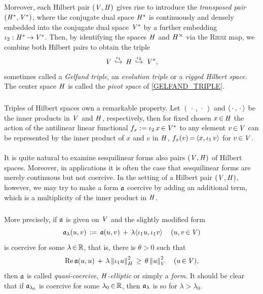 \documentclass[11pt,twoside]{article}
\begin{document}
\subparagraph*{} %
Moreover,
each Hilbert pair $(\mathit{V},\mathit{H})$ gives rise to introduce
the \textit{transposed pair} $(\mathit{H}^*,\mathit{V}^*)$,
where the conjugate dual space $\mathit{H}^*$
is continuously and densely embedded into
the conjugate dual space $\mathit{V}^*$
by a further embedding $\iota_2:\mathit{H}^* {\,\to\,} \mathit{V}^*$.
Then,
by identifying the spaces $\mathit{H}$ and $\mathit{H}^{\times}$
via the \textsc{Riesz} map,
we combine both Hilbert pairs to obtain the triple
\begin{equation}\label{GELFAND_TRIPLE}
\mathit{V} \, \overset{\iota_1}{\hookrightarrow} \,
\mathit{H} \, \overset{\iota_2}{\hookrightarrow} \, \mathit{V}^*,
\end{equation}
sometimes called a \textit{Gelfand triple},
an \textit{evolution triple} or a \textit{rigged Hilbert space}.
The center space $\mathit{H}$ is called
the \textit{pivot space} of \eqref{GELFAND_TRIPLE}.

\subparagraph*{}
Triples of Hilbert spaces own a remarkable property.
Let $(\,\cdot\,,\,\cdot\,)$ and $\langle \,\cdot\,,\,\cdot\, \rangle$
be the inner products in $\mathit{V}$ and $\mathit{H}$, respectively,
then for fixed chosen $x {\,\in\,} \mathit{H}$
the action of the antilinear linear functional
$f_x := \iota_2 \, x {\,\in\,} \mathit{V}^*$ to any element $v {\,\in\,} \mathit{V}$
can be represented by the inner product of $x$ and $v$ in $\mathit{H}$,
{\ie} $f_x(v) {\,=\,} \langle x,\iota_1 \, v \rangle$ for $v {\,\in\,} \mathit{V}$.

\paragraph*{} %
It is quite natural to examine sesquilinear forms
also {\wrt} pairs $(\mathit{V},\mathit{H})$ of Hilbert spaces.
Moreover,
in applications it is often the case
that sesquilinear forms are merely continuous but not coercive.
In the setting of a Hilbert pair $(\mathit{V},\mathit{H})$,
however,
we may try to make a form $\mathfrak{a}$ coercive
by adding an additional term,
which is a multiplicity of the inner product in $\mathit{H}$.

\subparagraph*{}
More precisely,
if $\mathfrak{a}$ is given on $\mathit{V}$ and the slightly modified form
\[
\mathfrak{a}_{\lambda}(u,v) \,:=\,
\mathfrak{a}(u,v) \, + \, \lambda \langle \iota_1 u,\iota_1 v \rangle\, \quad
(u,v {\,\in\,} \mathit{V})
\]
is coercive for some $\lambda {\,\in\,} {\mathbb{R}}$,
that is,
there is $\theta > 0$ such that
\begin{equation}\label{QUASI_COERCIVE}
\operatorname{Re} \mathfrak{a}(u,u)  \, + \,
\lambda \left\lVert \iota_1u \right\rVert_H^2 \, \geq \, \theta \left\lVert u \right\rVert_V^2
\quad (u {\,\in\,} \mathit{V}),
\end{equation}
then $\mathfrak{a}$ is called
\textit{quasi-coercive},
\textit{$\mathit{H}$-elliptic}
or simply a \textit{\GARDING} \textit{form}.
It should be clear that
if $\mathfrak{a}_{\lambda_0}$ is coercive for some $\lambda_0 {\,\in\,} {\mathbb{R}}$,
then $\mathfrak{a}_{\lambda}$ is so for $\lambda > \lambda_0$.
\end{document}

